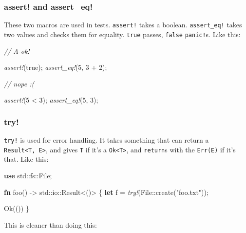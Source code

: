 \documentclass[a4paper,]{book}
\newenvironment{Shaded}{\begin{snugshade}}{\end{snugshade}}
\newcommand{\KeywordTok}[1]{\textcolor[rgb]{0.13,0.29,0.53}{\textbf{{#1}}}}
\newcommand{\DataTypeTok}[1]{\textcolor[rgb]{0.13,0.29,0.53}{{#1}}}
\newcommand{\DecValTok}[1]{\textcolor[rgb]{0.00,0.00,0.81}{{#1}}}
\newcommand{\ConstantTok}[1]{\textcolor[rgb]{0.00,0.00,0.00}{{#1}}}
\newcommand{\StringTok}[1]{\textcolor[rgb]{0.31,0.60,0.02}{{#1}}}
\newcommand{\CommentTok}[1]{\textcolor[rgb]{0.56,0.35,0.01}{\textit{{#1}}}}
\newcommand{\PreprocessorTok}[1]{\textcolor[rgb]{0.56,0.35,0.01}{\textit{{#1}}}}
\newcommand{\NormalTok}[1]{{#1}}
\begin{document}
\subsubsection{assert! and assert\_eq!}\label{assert-and-assert_eq}

These two macros are used in tests. \texttt{assert!} takes a boolean.
\texttt{assert\_eq!} takes two values and checks them for equality.
\texttt{true} passes, \texttt{false} \texttt{panic!}s. Like this:

\begin{Shaded}
\begin{Highlighting}[]
\CommentTok{// A-ok!}

\PreprocessorTok{assert!}\NormalTok{(}\ConstantTok{true}\NormalTok{);}
\PreprocessorTok{assert_eq!}\NormalTok{(}\DecValTok{5}\NormalTok{, }\DecValTok{3} \NormalTok{+ }\DecValTok{2}\NormalTok{);}

\CommentTok{// nope :(}

\PreprocessorTok{assert!}\NormalTok{(}\DecValTok{5} \NormalTok{< }\DecValTok{3}\NormalTok{);}
\PreprocessorTok{assert_eq!}\NormalTok{(}\DecValTok{5}\NormalTok{, }\DecValTok{3}\NormalTok{);}
\end{Highlighting}
\end{Shaded}

\subsubsection{try!}\label{try}

\texttt{try!} is used for error handling. It takes something that can
return a \texttt{Result\textless{}T,\ E\textgreater{}}, and gives
\texttt{T} if it's a \texttt{Ok\textless{}T\textgreater{}}, and
\texttt{return}s with the \texttt{Err(E)} if it's that. Like this:

\begin{Shaded}
\begin{Highlighting}[]
\KeywordTok{use} \NormalTok{std::fs::File;}

\KeywordTok{fn} \NormalTok{foo() -> std::io::}\DataTypeTok{Result}\NormalTok{<()> \{}
    \KeywordTok{let} \NormalTok{f = }\PreprocessorTok{try!}\NormalTok{(File::create(}\StringTok{"foo.txt"}\NormalTok{));}

    \ConstantTok{Ok}\NormalTok{(())}
\NormalTok{\}}
\end{Highlighting}
\end{Shaded}

This is cleaner than doing this:
\end{document}
